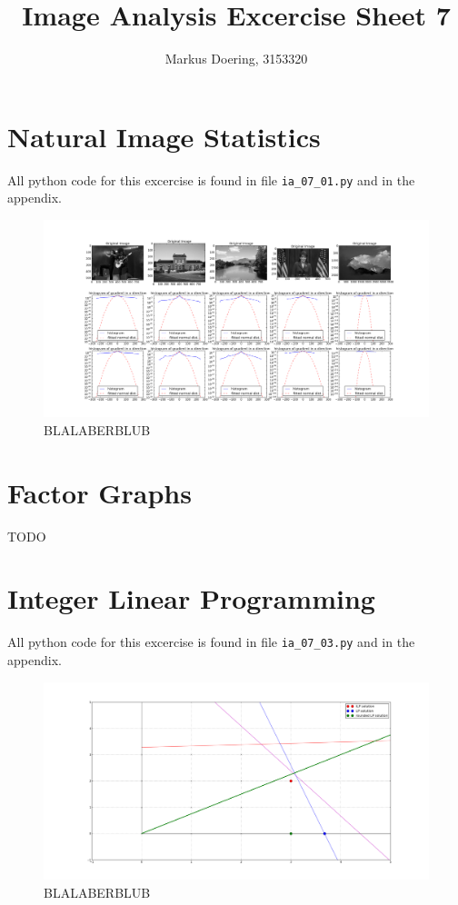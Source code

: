 \documentclass[11pt,a4paper]{scrartcl}
\begin{document}
\lstset{
    style=customc
} 

\title{Image Analysis Excercise Sheet 7}
\author{Markus Doering, 3153320}
\maketitle

\section{Natural Image Statistics}
All python code for this excercise is found in file \verb$ia_07_01.py$ and in the appendix. 
\begin{figure}[hb]
\includegraphics[width=.99\linewidth]{histograms.png}
\caption{BLALABERBLUB}
\end{figure}

\section{Factor Graphs}
TODO

\section{Integer Linear Programming}
All python code for this excercise is found in file \verb$ia_07_03.py$ and in the appendix. 
\begin{figure}[hb]
\includegraphics[width=.99\linewidth]{ex3.png}
\caption{BLALABERBLUB}
\end{figure}

\clearpage
\appendix

\newpage

\end{document}
